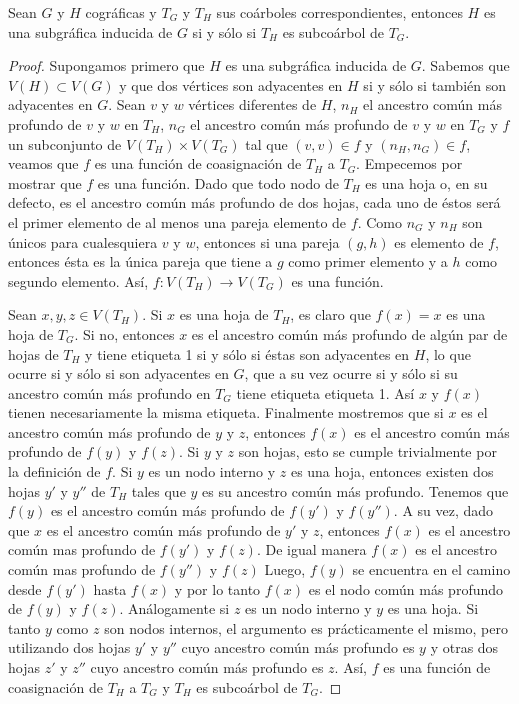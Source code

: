 \begin{lemma}\label{lema_subcoa_01}
    Sean $G$ y $H$ cográficas y $T_G$ y $T_H$ sus coárboles correspondientes, entonces $H$ es una subgráfica inducida de $G$ si y sólo si $T_H$ es subcoárbol de $T_G$.
\end{lemma}

\begin{proof}

  Supongamos primero que $H$ es una subgráfica inducida de $G$. Sabemos que
  $V(H) \subset V(G)$ y que dos vértices son adyacentes en $H$ si y sólo si
  también son adyacentes en $G$. Sean $v$ y $w$ vértices diferentes de $H$,
  $n_H$ el ancestro común más profundo de $v$ y $w$ en $T_H$, $n_G$ el
  ancestro común más profundo de $v$ y $w$ en $T_G$ y $f$ un subconjunto de
  $V(T_H) \times V(T_G)$ tal que $(v,v) \in f$ y $(n_H, n_G)\in f$, veamos
  que $f$ es una función de coasignación de $T_H$ a $T_G$. Empecemos por
  mostrar que $f$ es una función. Dado que todo nodo de $T_H$ es una hoja o,
  en su defecto, es el ancestro común más profundo de dos hojas, cada uno de
  \'estos será el primer elemento de al menos una pareja elemento de $f$. Como
  $n_G$ y $n_H$ son únicos para cualesquiera $v$ y $w$, entonces si una pareja
  $(g,h)$ es elemento de $f$, entonces ésta es la única pareja que tiene a
  $g$ como primer elemento y a $h$ como segundo elemento. Así,
  $f \colon V(T_H)\rightarrow V(T_G)$ es una función.

  Sean $x,y,z \in V(T_H)$. Si $x$ es una hoja de $T_H$, es claro que $f(x) =
  x$ es una hoja de $T_G$. Si no, entonces $x$ es el ancestro común más
  profundo de algún par de hojas de $T_H$ y tiene etiqueta 1 si y sólo si
  éstas son adyacentes en $H$, lo que ocurre si y sólo si son adyacentes en
  $G$, que a su vez ocurre si y sólo si su ancestro común más profundo en
  $T_G$ tiene etiqueta etiqueta 1. Así $x$ y $f(x)$ tienen necesariamente la
  misma etiqueta. Finalmente mostremos que si $x$ es el ancestro común más
  profundo de $y$ y $z$, entonces $f(x)$ es el ancestro común más profundo de
  $f(y)$ y $f(z)$. Si $y$ y $z$ son hojas, esto se cumple trivialmente por la
  definición de $f$. Si $y$ es un nodo interno y $z$ es una hoja, entonces
  existen dos hojas $y'$ y $y''$ de $T_H$ tales que $y$ es su ancestro común
  más profundo. Tenemos que $f(y)$ es el ancestro común más profundo de
  $f(y')$ y $f(y'')$. A su vez, dado que $x$ es el ancestro común más profundo
  de $y'$ y $z$, entonces $f(x)$ es el ancestro común mas profundo de $f(y')$
  y $f(z)$. De igual manera $f(x)$ es el ancestro común mas profundo de
  $f(y'')$ y $f(z)$ Luego, $f(y)$ se encuentra en el camino desde $f(y')$
  hasta $f(x)$ y por lo tanto $f(x)$ es el nodo común más profundo de $f(y)$ y
  $f(z)$. Análogamente si $z$ es un nodo interno y $y$ es una hoja. Si tanto
  $y$ como $z$ son nodos internos, el argumento es prácticamente el mismo,
  pero utilizando dos hojas $y'$ y $y''$ cuyo ancestro común más profundo es
  $y$ y otras dos hojas $z'$ y $z''$ cuyo ancestro común más profundo es $z$.
  Así, $f$ es una función de coasignación de $T_H$ a $T_G$ y $T_H$ es
  subcoárbol de $T_G$.


\end{proof}
